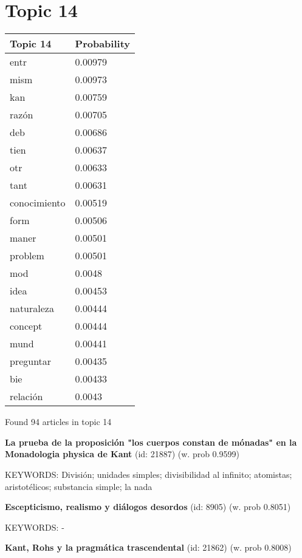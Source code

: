 \documentclass{article}
\begin{document}
\vfill
\newpage


\centering
\thispagestyle{empty}
\section*{Topic 14}\vfill
\begin{tabular}{ll}
\toprule
     Topic 14 & Probability \\
\midrule
         entr &     0.00979 \\
         mism &     0.00973 \\
          kan &     0.00759 \\
        razón &     0.00705 \\
          deb &     0.00686 \\
         tien &     0.00637 \\
          otr &     0.00633 \\
         tant &     0.00631 \\
 conocimiento &     0.00519 \\
         form &     0.00506 \\
        maner &     0.00501 \\
      problem &     0.00501 \\
          mod &      0.0048 \\
         idea &     0.00453 \\
   naturaleza &     0.00444 \\
      concept &     0.00444 \\
         mund &     0.00441 \\
    preguntar &     0.00435 \\
          bie &     0.00433 \\
     relación &      0.0043 \\
\bottomrule
\end{tabular}

\vfill
Found 94 articles in topic 14
\vfill

\textbf{La prueba de la proposición "los cuerpos constan de mónadas" en la Monadologia physica de Kant} (id: 21887)
 (w. prob 0.9599)


KEYWORDS:
División; unidades simples; divisibilidad al infinito; atomistas; aristotélicos; substancia simple; la nada
\vfill

\textbf{Escepticismo, realismo y diálogos desordos} (id: 8905)
 (w. prob 0.8051)


KEYWORDS:
-
\vfill

\textbf{Kant, Rohs y la pragmática trascendental} (id: 21862)
 (w. prob 0.8008)
\end{document}
